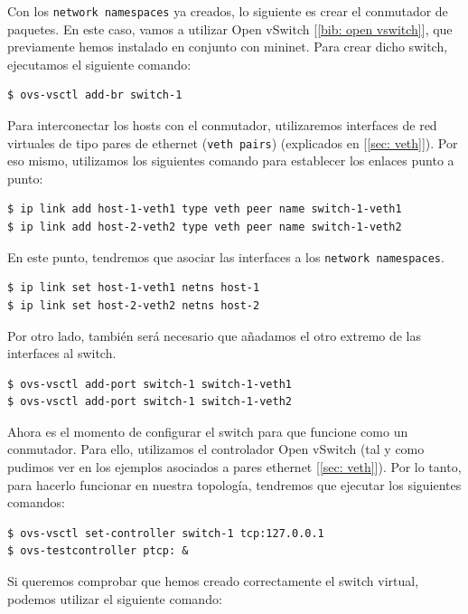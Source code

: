 \documentclass[12pt]{article}
\begin{document}
	\noindent Con los \texttt{network namespaces} ya creados, lo siguiente es crear el conmutador de paquetes. En este caso, vamos a utilizar Open vSwitch [\ref{bib: open vswitch}], que previamente hemos instalado en conjunto con mininet. Para crear dicho switch, ejecutamos el siguiente comando:
	
	\begin{verbatim}
$ ovs-vsctl add-br switch-1
	\end{verbatim}

	\noindent Para interconectar los hosts con el conmutador, utilizaremos interfaces de red virtuales de tipo pares de ethernet (\texttt{veth pairs}) (explicados en [\ref{sec: veth}]). Por eso mismo, utilizamos los siguientes comando para establecer los enlaces punto a punto:
	
	\begin{verbatim}
$ ip link add host-1-veth1 type veth peer name switch-1-veth1
$ ip link add host-2-veth2 type veth peer name switch-1-veth2
	\end{verbatim}

	\pagebreak

	\noindent En este punto, tendremos que asociar las interfaces a los \texttt{network namespaces}.
	
	\begin{verbatim}
$ ip link set host-1-veth1 netns host-1
$ ip link set host-2-veth2 netns host-2
	\end{verbatim}

	\noindent Por otro lado, también será necesario que añadamos el otro extremo de las interfaces al switch.
	
	\begin{verbatim}
$ ovs-vsctl add-port switch-1 switch-1-veth1
$ ovs-vsctl add-port switch-1 switch-1-veth2
	\end{verbatim}

	\noindent Ahora es el momento de configurar el switch para que funcione como un conmutador. Para ello, utilizamos el controlador Open vSwitch (tal y como pudimos ver en los ejemplos asociados a pares ethernet [\ref{sec: veth}]). Por lo tanto, para hacerlo funcionar en nuestra topología, tendremos que ejecutar los siguientes comandos:
	
	\begin{verbatim}
$ ovs-vsctl set-controller switch-1 tcp:127.0.0.1
$ ovs-testcontroller ptcp: &
	\end{verbatim}

	\noindent Si queremos comprobar que hemos creado correctamente el switch virtual, podemos utilizar el siguiente comando:
	
\end{document}

